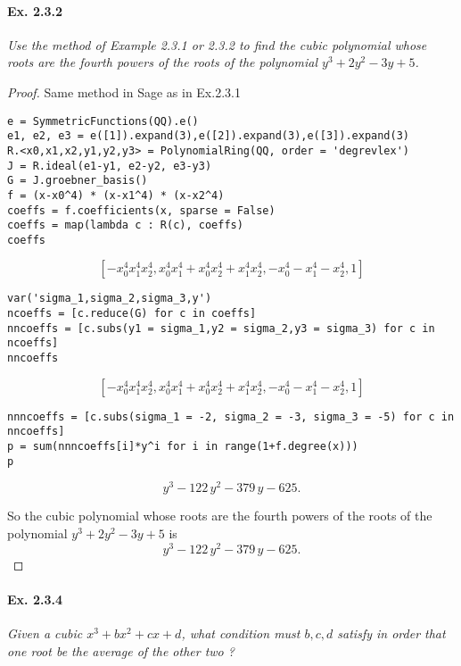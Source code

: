 \documentclass[11pt,a4paper]{article}
\begin{document}
\paragraph{Ex. 2.3.2}

{\it Use the method of Example 2.3.1 or 2.3.2 to find the cubic polynomial whose roots are the fourth powers of the roots of the polynomial $y^3+2y^2-3y+5$.
}

\begin{proof}
Same method in Sage as in Ex.2.3.1
\begin{verbatim}
e = SymmetricFunctions(QQ).e()
e1, e2, e3 = e([1]).expand(3),e([2]).expand(3),e([3]).expand(3)
R.<x0,x1,x2,y1,y2,y3> = PolynomialRing(QQ, order = 'degrevlex')
J = R.ideal(e1-y1, e2-y2, e3-y3)
G = J.groebner_basis()
f = (x-x0^4) * (x-x1^4) * (x-x2^4)
coeffs = f.coefficients(x, sparse = False)
coeffs = map(lambda c : R(c), coeffs)
coeffs
\end{verbatim}
$$\left[- x_{0}^{4} x_{1}^{4} x_{2}^{4}, x_{0}^{4} x_{1}^{4} + x_{0}^{4}
x_{2}^{4} + x_{1}^{4} x_{2}^{4}, - x_{0}^{4} -  x_{1}^{4} -  x_{2}^{4},
1\right]
$$
\begin{verbatim}
var('sigma_1,sigma_2,sigma_3,y')
ncoeffs = [c.reduce(G) for c in coeffs]
nncoeffs = [c.subs(y1 = sigma_1,y2 = sigma_2,y3 = sigma_3) for c in ncoeffs]
nncoeffs
\end{verbatim}
$$\left[- x_{0}^{4} x_{1}^{4} x_{2}^{4}, x_{0}^{4} x_{1}^{4} + x_{0}^{4}
x_{2}^{4} + x_{1}^{4} x_{2}^{4}, - x_{0}^{4} -  x_{1}^{4} -  x_{2}^{4},
1\right]
$$
\begin{verbatim}
nnncoeffs = [c.subs(sigma_1 = -2, sigma_2 = -3, sigma_3 = -5) for c in nncoeffs]
p = sum(nnncoeffs[i]*y^i for i in range(1+f.degree(x)))
p
\end{verbatim}
$$y^{3} - 122 \, y^{2} - 379 \, y - 625.$$

So the cubic polynomial whose roots are the fourth powers of the roots of the polynomial $y^3+2y^2-3y+5$ is
$$y^{3} - 122 \, y^{2} - 379 \, y - 625.$$
\end{proof}

\paragraph{Ex. 2.3.4}

{\it Given a cubic $x^3+bx^2+cx+d$, what condition must $b,c,d$ satisfy in order that one root be the average of the other two ?
}
\end{document}
